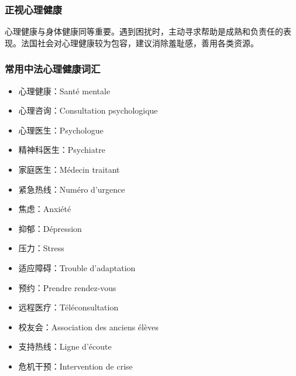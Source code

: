 \subsubsection{正视心理健康}
心理健康与身体健康同等重要。遇到困扰时，主动寻求帮助是成熟和负责任的表现。法国社会对心理健康较为包容，建议消除羞耻感，善用各类资源。

\subsubsection{常用中法心理健康词汇}
\begin{itemize}
    \item 心理健康：Santé mentale
    \item 心理咨询：Consultation psychologique
    \item 心理医生：Psychologue
    \item 精神科医生：Psychiatre
    \item 家庭医生：Médecin traitant
    \item 紧急热线：Numéro d’urgence
    \item 焦虑：Anxiété
    \item 抑郁：Dépression
    \item 压力：Stress
    \item 适应障碍：Trouble d’adaptation
    \item 预约：Prendre rendez-vous
    \item 远程医疗：Téléconsultation
    \item 校友会：Association des anciens élèves
    \item 支持热线：Ligne d’écoute
    \item 危机干预：Intervention de crise
\end{itemize}
